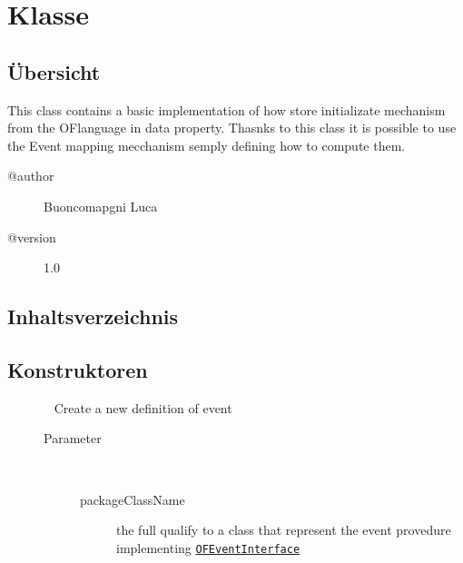 
\section[OFEventRepresentation]{Klasse }\label{ontologyFramework.OFEventManagement.OFEventRepresentation-class}
\subsection{Übersicht}
This class contains a basic implementation of how store initializate mechanism
 from the OFlanguage in data property.
 Thasnks to this class it is possible to use the Event mapping mecchanism 
 semply defining how to compute them.
\begin{description}
\item[@author] 
Buoncomapgni Luca
\item[@version] 
1.0
\end{description}
\subsection{Inhaltsverzeichnis}
\subsection{Konstruktoren}
\begin{description}
\item[{\label{ontologyFramework.OFEventManagement.OFEventRepresentation(java.lang.String)}}]
~ Create a new definition of event
\begin{description}
\item[Parameter] ~
\begin{description}
\item[packageClassName]
the full qualify to a class that represent the event provedure 
 implementing \texttt{\hyperlink{ontologyFramework.OFEventManagement.OFLogicalEventManagement.OFEventInterface-class}{OFEventInterface}}
\end{description}
\end{description}
\end{description}
